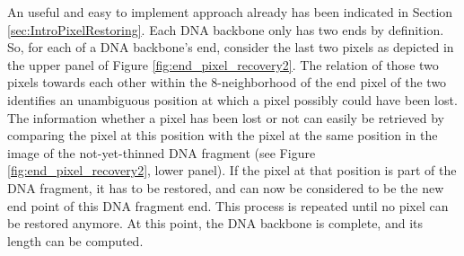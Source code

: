 \documentclass{article}
\begin{document}
An useful and easy to implement approach already has been indicated in Section \ref{sec:IntroPixelRestoring}. Each DNA backbone only has two ends by definition. So, for each of a DNA backbone's end, consider the last two pixels as depicted in the upper panel of Figure \ref{fig:end_pixel_recovery2}. The relation of those two pixels towards each other within the 8-neighborhood of the end pixel of the two identifies an unambiguous position at which a pixel possibly could have been lost. The information whether a pixel has been lost or not can easily be retrieved by comparing the pixel at this position with the pixel at the same position in the image of the not-yet-thinned DNA fragment (see Figure \ref{fig:end_pixel_recovery2}, lower panel). If the pixel at that position is part of the DNA fragment, it has to be restored, and can now be considered to be the new end point of this DNA fragment end. This process is repeated until no pixel can be restored anymore. At this point, the DNA backbone is complete, and its length can be computed.
\end{document}
